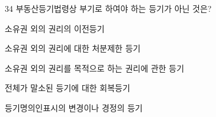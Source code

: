 \begin{question}{34}
부동산등기법령상 부기로 하여야 하는 등기가 아닌 것은?
\begin{choices}
  \item 소유권 외의 권리의 이전등기
  \item 소유권 외의 권리에 대한 처분제한 등기
  \item 소유권 외의 권리를 목적으로 하는 권리에 관한 등기
  \item 전체가 말소된 등기에 대한 회복등기
  \item 등기명의인표시의 변경이나 경정의 등기
\end{choices}
\end{question}
